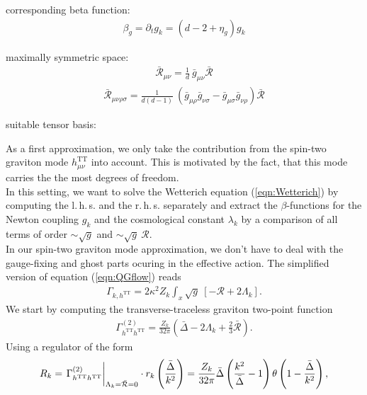 corresponding beta function:
\begin{align}
	\beta_g = \partial_t g_k = \left(d-2 + \eta_g\right)g_k
\end{align}

maximally symmetric space:
\begin{align}
	\bar{\mathcal{R}}_{\mu\nu} = \frac{1}{d} \ \bar{g}_{\mu\nu} \bar{\mathcal{R}}
\end{align}
\begin{align}
	\bar{\mathcal{R}}_{\mu\nu\rho\sigma} = \frac{1}{d(d-1)} \ (\bar{g}_{\mu\rho}\bar{g}_{\nu\sigma} - \bar{g}_{\mu\sigma}\bar{g}_{\nu\rho}) \bar{\mathcal{R}}
\end{align}

suitable tensor basis:

As a first approximation, we only take the contribution from the spin-two graviton mode $h_{\mu\nu}^{\text{TT}}$ into account. This is motivated by the fact, that this mode carries the the most degrees of freedom.\\ %
In this setting, we want to solve the Wetterich equation (\ref{eqn:Wetterich}) by computing the l.\,h.\,s. and the r.\,h.\,s. separately and extract the $\beta$-functions for the Newton coupling $g_k$ and the cosmological constant $\lambda_k$ by a comparison of all terms of order $\sim\sqrt{g}$ and $\sim \sqrt{g} \ \mathcal{R}$. \\
In our spin-two graviton mode approximation, we don't have to deal with the gauge-fixing and ghost parts ocuring in the effective action. The simplified version of equation (\ref{eqn:QGflow}) reads
\begin{align}
	\Gamma_{k, h^{\text{TT}}} = 2\kappa^2Z_k \int_x \sqrt{g} \ [-\mathcal{R} + 2\Lambda_k].
\end{align}
We start by computing the transverse-traceless graviton two-point function
\begin{align}
\Gamma_{h^{\text{TT}}h^{\text{TT}}}^{(2)} = \frac{Z_k}{32\pi}\left(\bar{\Delta} - 2\Lambda_k+\frac{2}{3}\bar{\mathcal{R}}\right).
\end{align}
Using a regulator of the form
\begin{align}
R_k  = \eval{\Gamma_{h^{\text{TT}}h^{\text{TT}}}^{(2)}}_{\Lambda_k=\bar{\mathcal{R}}=0} \cdot r_k\left(\frac{\bar{\Delta}}{k^2}\right) = \frac{Z_k}{32\pi}\bar{\Delta}\left(\frac{k^2}{\bar{\Delta}}-1\right)\theta\left(1-\frac{\bar{\Delta}}{k^2}\right), \nonumber
\end{align}
